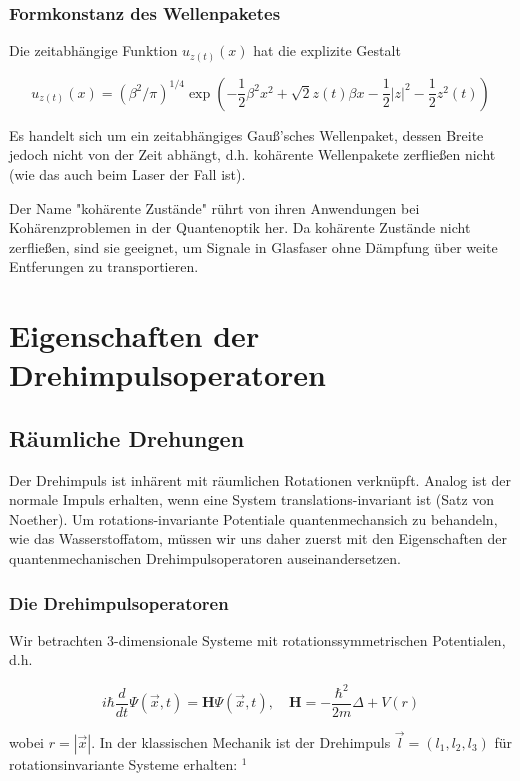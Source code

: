 \documentclass[10pt, letterpaper]{article}
\begin{document}
\subsubsection*{Formkonstanz des Wellenpaketes}
Die zeitabhängige Funktion $u_{z(t)}(x)$ hat die explizite Gestalt

$$
u_{z(t)}(x)=\left(\beta^{2} / \pi\right)^{1 / 4} \exp \left(-\frac{1}{2} \beta^{2} x^{2}+\sqrt{2} z(t) \beta x-\frac{1}{2}|z|^{2}-\frac{1}{2} z^{2}(t)\right)
$$

Es handelt sich um ein zeitabhängiges Gauß'sches Wellenpaket, dessen Breite jedoch nicht von der Zeit abhängt, d.h. kohärente Wellenpakete zerfließen nicht (wie das auch beim Laser der Fall ist).

Der Name "kohärente Zustände" rührt von ihren Anwendungen bei Kohärenzproblemen in der Quantenoptik her. Da kohärente Zustände nicht zerfließen, sind sie geeignet, um Signale in Glasfaser ohne Dämpfung über weite Entferungen zu transportieren.



\pagebreak



\section{Eigenschaften der Drehimpulsoperatoren}

\subsection*{Räumliche Drehungen}
Der Drehimpuls ist inhärent mit räumlichen Rotationen verknüpft. Analog ist der normale Impuls erhalten, wenn eine System translations-invariant ist (Satz von Noether). Um rotations-invariante Potentiale quantenmechansich zu behandeln, wie das Wasserstoffatom, müssen wir uns daher zuerst mit den Eigenschaften der quantenmechanischen Drehimpulsoperatoren auseinandersetzen.

\subsubsection*{Die Drehimpulsoperatoren}
Wir betrachten 3-dimensionale Systeme mit rotationssymmetrischen Potentialen, d.h.

$$
i \hbar \frac{d}{d t} \Psi(\vec{x}, t)=\mathbf{H} \Psi(\vec{x}, t), \quad \mathbf{H}=-\frac{\hbar^{2}}{2 m} \Delta+V(r)
$$

wobei $r=|\vec{x}|$. In der klassischen Mechanik ist der Drehimpuls $\vec{l}=\left(l_{1}, l_{2}, l_{3}\right)$ für rotationsinvariante Systeme erhalten: ${ }^{1}$
\end{document}
